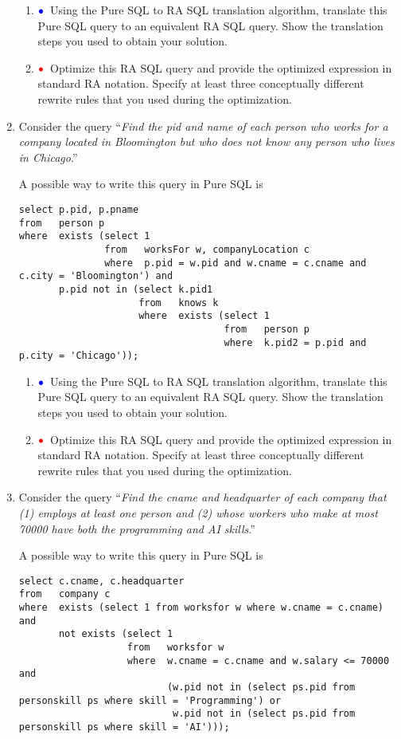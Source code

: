 \documentclass[11pt]{article}
\newcommand{\red}[1]{{\color{red}#1}}
\newcommand{\blue}[1]{{\color{blue}#1}}
\newcommand{\redbullet}{$\red{\bullet}$}
\newcommand{\bluebullet}{$\blue{\bullet}$}
\begin{document}
\begin{enumerate}[resume]
\begin{enumerate}  
\item  \bluebullet\ Using the Pure SQL to RA SQL translation algorithm, translate this Pure SQL query to an
equivalent RA SQL query.   Show the translation steps you used to obtain your solution.
\item  \redbullet\ Optimize this RA SQL query and provide the optimized expression in standard RA notation.
Specify at least three conceptually different rewrite rules that you used during the optimization.
\end{enumerate}

\item Consider the query ``\emph{Find the pid and name of each person who 
works for a company located in Bloomington but who does not 
know any person who lives in Chicago}.''
 
A possible way to write this query in Pure SQL is
{\footnotesize
\begin{verbatim}
select p.pid, p.pname
from   person p
where  exists (select 1
               from   worksFor w, companyLocation c
               where  p.pid = w.pid and w.cname = c.cname and c.city = 'Bloomington') and
       p.pid not in (select k.pid1
                     from   knows k
                     where  exists (select 1
                                    from   person p
                                    where  k.pid2 = p.pid and  p.city = 'Chicago'));
\end{verbatim}
}

\begin{enumerate}  
\item  \bluebullet\ Using the Pure SQL to RA SQL translation algorithm, translate this Pure SQL query to an
equivalent RA SQL query.   Show the translation steps you used to obtain your solution.
\item  \redbullet\ Optimize this RA SQL query and provide the optimized expression in standard RA notation.
Specify at least three conceptually different rewrite rules that you used during the optimization.
\end{enumerate}
\newpage
\item Consider the query ``\emph{Find the cname and headquarter of each company that (1) employs at least one person and (2) whose workers who make at most 70000 have both the programming and AI skills}.''

A possible way to write this query in Pure SQL is
{\tiny
\begin{verbatim}
select c.cname, c.headquarter
from   company c
where  exists (select 1 from worksfor w where w.cname = c.cname) and
       not exists (select 1
                   from   worksfor w
                   where  w.cname = c.cname and w.salary <= 70000 and
                          (w.pid not in (select ps.pid from personskill ps where skill = 'Programming') or
                           w.pid not in (select ps.pid from personskill ps where skill = 'AI')));
                                            

\end{verbatim}}
\end{enumerate}
\end{document}
